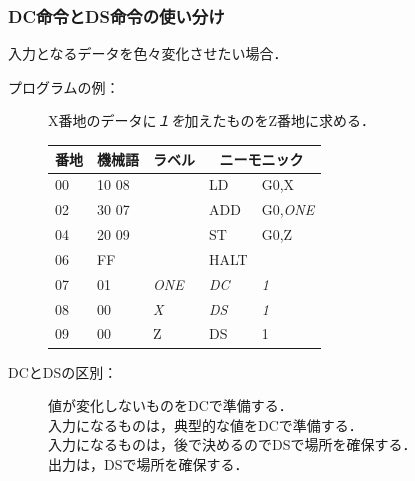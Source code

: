 \documentclass{beamer}                 %
\begin{document}
\begin{frame}
  \frametitle{DC命令とDS命令の使い分け}
  入力となるデータを色々変化させたい場合．
  \begin{description}
  \item[プログラムの例：]
    X番地のデータに\emph{１を}加えたものをZ番地に求める．\\
    {\ttfamily\small\begin{center}
      \begin{tabular}{|l|l|l|l l|} \hline
        番地 & 機械語 & ラベル & \multicolumn{2}{|c|}{ニーモニック} \\
        \hline
        00 & 10 08 &            & LD        & G0,X          \\
        02 & 30 07 &            & ADD       & G0,\emph{ONE} \\
        04 & 20 09 &            & ST        & G0,Z          \\
        06 & FF    &            & HALT      &               \\
        07 & 01    & \emph{ONE} & \emph{DC} & \emph{1}      \\
        08 & 00    & \emph{X}   & \emph{DS} & \emph{1}      \\
        09 & 00    & Z          & DS        & 1             \\
        \hline
      \end{tabular}
    \end{center}}
    \vfill

    \item[DCとDSの区別：]値が変化しないものをDCで準備する．\\
      入力になるものは，典型的な値をDCで準備する．\\
      入力になるものは，後で決めるのでDSで場所を確保する．\\
      出力は，DSで場所を確保する．
  \end{description}
\end{frame}
\end{document}

